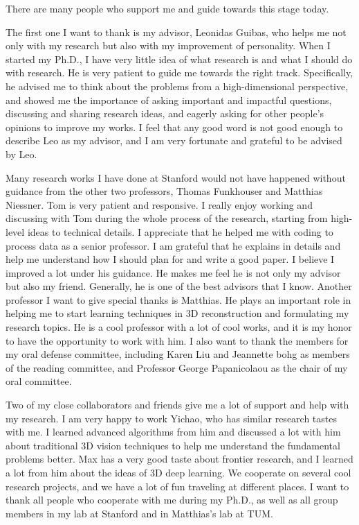 There are many people who support me and guide towards this stage today.

The first one I want to thank is my advisor, Leonidas Guibas, who helps me not only with my research but also with my improvement of personality.
When I started my Ph.D., I have very little idea of what research is and what I should do with research. He is very patient to guide me towards the right track. Specifically, he advised me to think about the problems from a high-dimensional perspective, and showed me the importance of asking important and impactful questions, discussing and sharing research ideas, and eagerly asking for other people's opinions to improve my works. I feel that any good word is not good enough to describe Leo as my advisor, and I am very fortunate and grateful to be advised by Leo.

Many research works I have done at Stanford would not have happened without guidance from the other two professors, Thomas Funkhouser and Matthias Niessner. Tom is very patient and responsive. I really enjoy working and discussing with Tom during the whole process of the research, starting from high-level ideas to technical details. I appreciate that he helped me with coding to process data as a senior professor. I am grateful that he explains in details and help me understand how I should plan for and write a good paper. I believe I improved a lot under his guidance. He makes me feel he is not only my advisor but also my friend. Generally, he is one of the best advisors that I know. Another professor I want to give special thanks is Matthias. He plays an important role in helping me to start learning techniques in 3D reconstruction and formulating my research topics. He is a cool professor with a lot of cool works, and it is my honor to have the opportunity to work with him. I also want to thank the members for my oral defense committee, including Karen Liu and Jeannette bohg as members of the reading committee, and Professor George Papanicolaou as the chair of my oral committee.

Two of my close collaborators and friends give me a lot of support and help with my research. I am very happy to work Yichao, who has similar research tastes with me. I learned advanced algorithms from him and discussed a lot with him about traditional 3D vision techniques to help me understand the fundamental problems better.
Max has a very good taste about frontier research, and I learned a lot from him about the ideas of 3D deep learning. We cooperate on several cool research projects, and we have a lot of fun traveling at different places. I want to thank all people who cooperate with me during my Ph.D., as well as all group members in my lab at Stanford and in Matthias's lab at TUM.

